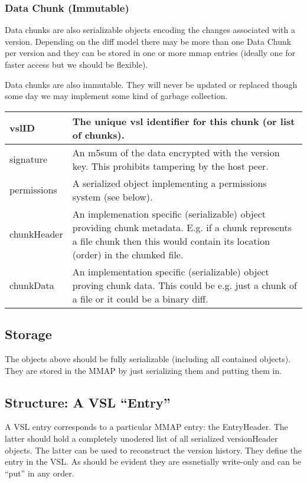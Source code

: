 \documentclass[10pt]{article}
\begin{document}
\subsubsection{Data Chunk (Immutable)}

Data chunks are also serializable objects encoding the changes associated with
a version.  Depending on the diff model there may be more than one Data Chunk
per version and they can be stored in one or more mmap entries (ideally one for
faster access but we should be flexible).

Data chunks are also immutable.  They will never be updated or replaced though
some day we may implement some kind of garbage collection.


\begin{tabular}{|l|p{12cm}|}
\hline
vslID & The unique vsl identifier for this chunk (or list of chunks).\\
\hline
signature & An m5sum of the data encrypted with the version key.  This prohibits tampering by the host peer.\\
\hline
permissions & A serialized object implementing a permissions system (see below).\\
\hline
chunkHeader & An implemenation specific (serializable) object providing chunk metadata.  E.g. if a chunk represents a file chunk then this would contain its location (order) in the chunked file.\\
\hline
chunkData & An implementation specific (serializable) object proving chunk data.  This could be e.g. just a chunk of a file or it could be a binary diff.\\
\hline
\end{tabular}


\subsection{Storage}

The objects above should be fully serializable (including all contained objects).  They are stored in the MMAP by just serializing them and putting them in.


\subsection{Structure: A VSL ``Entry''}

A VSL entry corresponds to a particular MMAP entry: the EntryHeader.  The latter
should hold a completely unodered list of all serialized versionHeader objects.
The latter can be used to reconstruct the version history.  They define the
entry in the VSL.  As should be evident they are essnetially write-only and can
be ``put'' in any order.  
\end{document}
